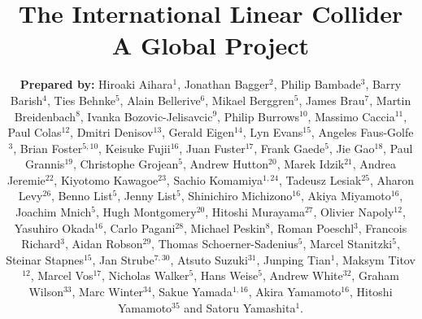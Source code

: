 \documentclass[%
reprint,
 floatfix,
 amsmath,amssymb,
 aps,
]{revtex4-1}
\begin{document}

\title{The International Linear Collider \\ A Global Project}%

\author{\textbf{Prepared by:}
Hiroaki Aihara$^1$, Jonathan Bagger$^2$, Philip Bambade$^3$, Barry Barish$^4$,  Ties Behnke$^5$, Alain Bellerive$^6$, Mikael Berggren$^5$, James Brau$^7$, Martin Breidenbach$^8$, 
Ivanka Bozovic-Jelisavcic$^9$,
Philip Burrows$^{10}$, Massimo Caccia$^{11}$, Paul Colas$^{12}$, Dmitri Denisov$^{13}$, Gerald Eigen$^{14}$, Lyn Evans$^{15}$, Angeles Faus-Golfe$^{3}$, Brian Foster$^{5,10}$, Keisuke Fujii$^{16}$, Juan Fuster$^{17}$, Frank Gaede$^{5}$, Jie Gao$^{18}$, Paul Grannis$^{19}$, Christophe Grojean$^{5}$, Andrew Hutton$^{20}$, Marek Idzik$^{21}$, Andrea Jeremie$^{22}$, Kiyotomo Kawagoe$^{23}$, Sachio Komamiya$^{1,24}$, Tadeusz Lesiak$^{25}$, Aharon Levy$^{26}$, Benno List$^{5}$, Jenny List$^{5}$, Shinichiro Michizono$^{16}$, Akiya Miyamoto$^{16}$, Joachim Mnich$^{5}$, Hugh Montgomery$^{20}$, Hitoshi Murayama$^{27}$, Olivier Napoly$^{12}$, Yasuhiro Okada$^{16}$, Carlo Pagani$^{28}$, Michael Peskin$^{8}$, Roman Poeschl$^{3}$, Francois Richard$^{3}$, Aidan Robson$^{29}$, Thomas Schoerner-Sadenius$^{5}$, Marcel Stanitzki$^5$, Steinar Stapnes$^{15}$, Jan Strube$^{7,30}$, Atsuto Suzuki$^{31}$, Junping Tian$^{1}$, Maksym Titov$^{12}$, Marcel Vos$^{17}$, Nicholas Walker$^{5}$, Hans Weise$^{5}$, Andrew White$^{32}$, Graham Wilson$^{33}$, Marc Winter$^{34}$, Sakue Yamada$^{1,16}$, Akira Yamamoto$^{16}$, Hitoshi Yamamoto$^{35}$ and Satoru Yamashita$^{1}$. }
\end{document}
